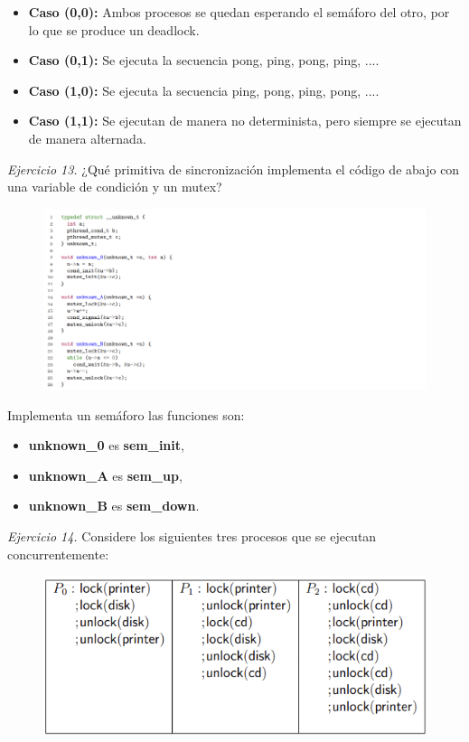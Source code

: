 \documentclass[12pt]{article}
\begin{document}
\begin{rta}
    \begin{itemize}
        \item \textbf{Caso (0,0):} Ambos procesos se quedan esperando el semáforo del otro, por lo que se produce un deadlock.
        \item \textbf{Caso (0,1):} Se ejecuta la secuencia pong, ping, pong, ping, ....
        \item \textbf{Caso (1,0):} Se ejecuta la secuencia ping, pong, ping, pong, ....
        \item \textbf{Caso (1,1):} Se ejecutan de manera no determinista, pero siempre se ejecutan de manera alternada.
    \end{itemize}
\end{rta}

\noindent \textit{Ejercicio 13.} ¿Qué primitiva de sincronización implementa el código de abajo con una variable de condición y un mutex?

\begin{figure}[h]
    \centering
    \includegraphics[width=1\textwidth]{c11.png}
\end{figure}

\begin{rta}
    Implementa un semáforo las funciones son:
    \begin{itemize}
        \item \textbf{unknown\_0} es \textbf{sem\_init},
        \item \textbf{unknown\_A} es \textbf{sem\_up},
        \item \textbf{unknown\_B} es \textbf{sem\_down}.
    \end{itemize}
\end{rta}
\newpage
\noindent \textit{Ejercicio 14.} Considere los siguientes tres procesos que se ejecutan concurrentemente:

\begin{figure}[h]
    \centering
    \includegraphics[width=0.6 \textwidth]{c12.png}
\end{figure}
\end{document}
